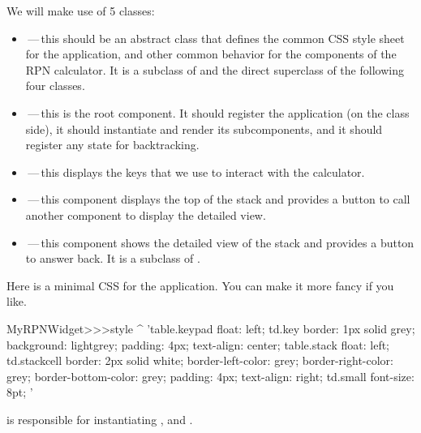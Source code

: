 \documentclass[a4paper,10pt,twoside]{book}
\begin{document}
We will make use of 5 classes:
\begin{itemize}
  \item {}\,---\,this should be an abstract class that defines the common CSS style sheet for the application, and other common behavior for the components of the RPN calculator.
  It is a subclass of  and the direct superclass of the following four classes. 
  
    \item {}\,---\,this is the root component.
  It should register the application (on the class side), it should instantiate and render its subcomponents, and it should register any state for backtracking.
  \item {}\,---\,this displays the keys that we use to interact with the calculator.
  \item {}\,---\,this component displays the top of the stack and provides a button to call another component to display the detailed view.
  \item {}\,---\,this component shows the detailed view of the stack and provides a button to answer back.
  It is a subclass of .
\end{itemize}


Here is a minimal CSS for the application.
You can make it more fancy if you like.
\begin{code}{}
MyRPNWidget>>>style
	^ 'table.keypad { float: left; }
td.key {
	border: 1px solid grey;
	background: lightgrey;
	padding: 4px;
	text-align: center;
}
table.stack { float: left; }
td.stackcell {
	border: 2px solid white;
	border-left-color: grey;
	border-right-color: grey;
	border-bottom-color: grey;
	padding: 4px;
	text-align: right;
}
td.small { font-size: 8pt; }'
\end{code}


 is responsible for instantiating ,  and .
\end{document}
